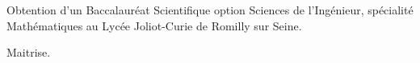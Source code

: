 \begin{rubric}{%
}

\entry*[2005]
Obtention d'un Baccalauréat Scientifique option Sciences de l'Ingénieur, spécialité Mathématiques au Lycée Joliot-Curie de Romilly sur Seine.

\entry*[Anglais]
Maitrise.








\end{rubric}

